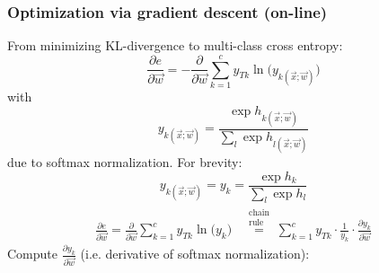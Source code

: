 \begin{frame}\frametitle{Optimization via gradient descent (on-line)}
From minimizing KL-divergence to multi-class cross entropy:
	\begin{equation}
			\frac{\partial e}{\partial \vec{w}}
		=  - \frac{\partial}{\partial \vec{w}} 
		  	\sum_{k = 1}^c y_{Tk} 
		  	\ln \big(y_{k (\vec{x}; \vec{w})}\big)
	\end{equation}
	with
	\begin{equation}
		  	y_{k (\vec{x};\vec{w})} = \frac{\exp h_{k (\vec{x};\vec{w})}}
		  		{\sum_l \exp h_{l (\vec{x};\vec{w})}}
	\end{equation}
	due to softmax normalization.
	For brevity:
	\begin{equation}
		  	y_{k (\vec{x};\vec{w})} = 
		  	y_{k} = \frac{\exp h_{k}}
		  		{\sum_l \exp h_{l}}
	\end{equation}
	\begin{align}
	\frac{\partial e}{\partial \vec{w}} =
	\frac{\partial}{\partial \vec{w}} 
		  	\sum_{k = 1}^c y_{Tk}
		  	\ln \big(y_{k}\big)
		& \stackrel{\substack{\text{chain}\\\text{rule}}}{=} 
		\sum\limits_{k = 1}^c y_{Tk} \cdot \frac{1}{y_k} \cdot \frac{\partial y_k}{\partial \vec{w}}
	\end{align}
	Compute $\frac{\partial y_k}{\partial \vec{w}}$ (i.e. derivative of softmax normalization):
	

\end{frame}

